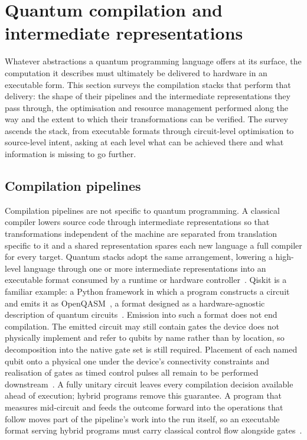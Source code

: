 \section{Quantum compilation and intermediate representations}\label{sec:lit_rev:compilation}

Whatever abstractions a quantum programming language offers at its surface, the computation it describes must ultimately be delivered to hardware in an executable form.
This section surveys the compilation stacks that perform that delivery: the shape of their pipelines and the intermediate representations they pass through, the optimisation and resource management performed along the way and the extent to which their transformations can be verified.
The survey ascends the stack, from executable formats through circuit-level optimisation to source-level intent, asking at each level what can be achieved there and what information is missing to go further.

\subsection{Compilation pipelines}\label{subsec:lit_rev:compilation:pipelines}
Compilation pipelines are not specific to quantum programming.
A classical compiler lowers source code through intermediate representations so that transformations independent of the machine are separated from translation specific to it and a shared representation spares each new language a full compiler for every target.
Quantum stacks adopt the same arrangement, lowering a high-level language through one or more intermediate representations into an executable format consumed by a runtime or hardware controller~\cite{irreview2024}.
Qiskit is a familiar example: a Python framework in which a program constructs a circuit and emits it as OpenQASM~\cite{aleksandrowicz2019qiskit}, a format designed as a hardware-agnostic description of quantum circuits~\cite{cross2017openqasm}.
Emission into such a format does not end compilation.
The emitted circuit may still contain gates the device does not physically implement and refer to qubits by name rather than by location, so decomposition into the native gate set is still required.
Placement of each named qubit onto a physical one under the device's connectivity constraints and realisation of gates as timed control pulses all remain to be performed downstream~\cite{cross2022openqasm3}.
A fully unitary circuit leaves every compilation decision available ahead of execution; hybrid programs remove this guarantee.
A program that measures mid-circuit and feeds the outcome forward into the operations that follow moves part of the pipeline's work into the run itself, so an executable format serving hybrid programs must carry classical control flow alongside gates~\cite{cross2022openqasm3}.

